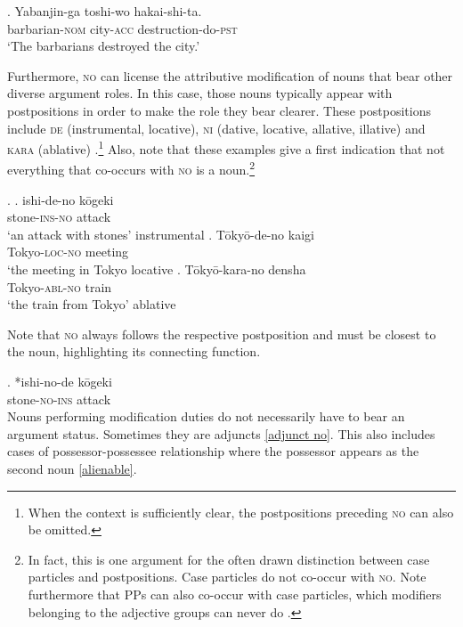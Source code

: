 \documentclass [output=book,colorlinks,citecolor=brown]{langscibook}
\begin{document}
\exg. Yabanjin-ga toshi-wo hakai-shi-ta.\\
barbarian-\textsc{nom} city-\textsc{acc} destruction-do-\textsc{pst}\\
`The barbarians destroyed the city.’

Furthermore, \textsc{no} can license the attributive modification of nouns that bear other diverse argument roles. In this case, those nouns typically appear with postpositions in order to make the role they bear clearer. These postpositions include \textsc{de} (instrumental, locative), \textsc{ni} (dative, locative, allative, illative) and \textsc{kara} (ablative) \citep{murasugi:1991:noun,saito:2008:N}.\footnote{When the context is sufficiently clear, the postpositions preceding \textsc{no} can also be omitted.} Also, note that these examples give a first indication that not everything that co-occurs with \textsc{no} is a noun.\footnote{In fact, this is one argument for the often drawn distinction between case particles and postpositions. Case particles do not co-occur with \textsc{no}. Note furthermore that PPs can also co-occur with case particles, which modifiers belonging to the adjective groups can never do \citep{murasugi:1991:noun, urushibara:1993:syntactic}.}


 \ex. \label{no with case} \ag. ishi-de-no kōgeki\\
stone-\textsc{ins-no} attack\\
`an attack with stones' \null \hfill instrumental \citep[248]{saito:2008:N}
\bg. Tōkyō-de-no kaigi\\
Tokyo-\textsc{loc-no} meeting\\
`the meeting in Tokyo \null \hfill locative
\cg. Tōkyō-kara-no densha\\
Tokyo-\textsc{abl-no} train\\
`the train from Tokyo' \null \hfill ablative \citep[50]{murasugi:1991:noun}

Note that \textsc{no} always follows the respective postposition and must be closest to the noun, highlighting its connecting function.

\exg. *ishi-no-de kōgeki\\
stone-\textsc{no-ins} attack\\

Nouns performing modification duties do not necessarily have to bear an argument status. Sometimes they are adjuncts \ref{adjunct no}. This also includes cases of possessor-possessee relationship where the possessor appears as the second noun \ref{alienable}.
\end{document}
